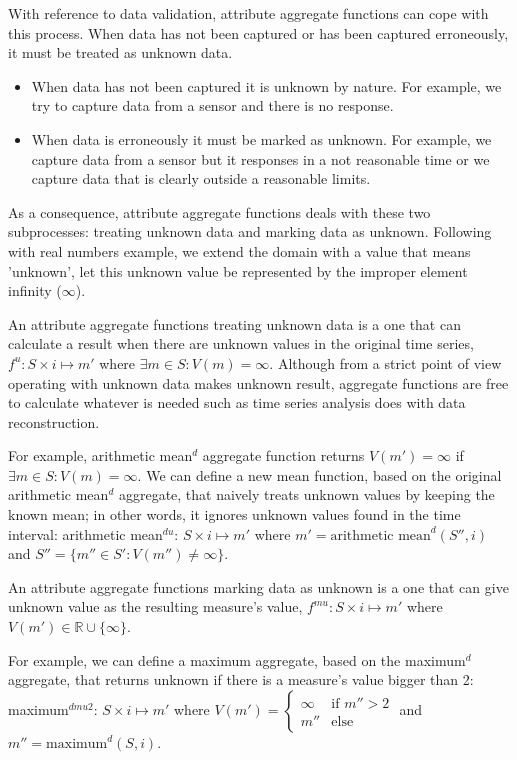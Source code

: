 With reference to data validation, attribute aggregate functions
can cope with this process. When data has not been captured or has
been captured erroneously, it must be treated as unknown data.
\begin{itemize}
\item When data has not been captured it is unknown by nature. For
  example, we try to capture data from a sensor and there is no
  response.
\item When data is erroneously it must be marked as unknown. For
  example, we capture data from a sensor but it responses in a not
  reasonable time or we capture data that is clearly outside a
  reasonable limits.
\end{itemize}
As a consequence, attribute aggregate functions deals with these two
subprocesses: treating unknown data and marking data as
unknown. Following with real numbers example, we extend the
domain with a value that means 'unknown', let this unknown value be
represented by the improper element infinity ($\infty$).

An attribute aggregate functions treating unknown
data is a one that can calculate a result when there are unknown
values in the original time series, $f^u: S \times i \mapsto m'$ where
$\exists m \in S: V(m)=\infty$. Although from a strict point of view
operating with unknown data makes unknown result, aggregate functions
are free to calculate whatever is needed such as time series analysis
does with data reconstruction.

For example, arithmetic mean$^{d}$ aggregate function returns
$V(m')=\infty$ if $\exists m \in S: V(m)=\infty$.  We can define a new
mean function, based on the original arithmetic mean$^{d}$ aggregate,
that naively treats unknown values by keeping the
known mean; in other words, it ignores unknown values found in the time
interval: arithmetic mean$^{du}$: $S \times i \mapsto m'$ where $m' =
\text{arithmetic mean}^{d}(S'',i)$ and $S''= \{m''\in S':V(m'')\neq
\infty\}$.

An attribute aggregate functions marking data as unknown is a one
that can give unknown value as the resulting measure's value, $f^{mu}:
S \times i \mapsto m'$ where $V(m')\in \mathbb{R}\cup\{\infty\}$.

For example, we can define a maximum aggregate, based on the
maximum$^d$ aggregate, that returns unknown if there is a
measure's value bigger than 2:  maximum$^{dmu2}$: $S \times i
\mapsto m'$ where $V(m') = 
\begin{cases}
  \infty &\text{if }  m''>2\\
  m'' & \text{else }
\end{cases}$ and $m''=\text{maximum}^d(S,i)$.

